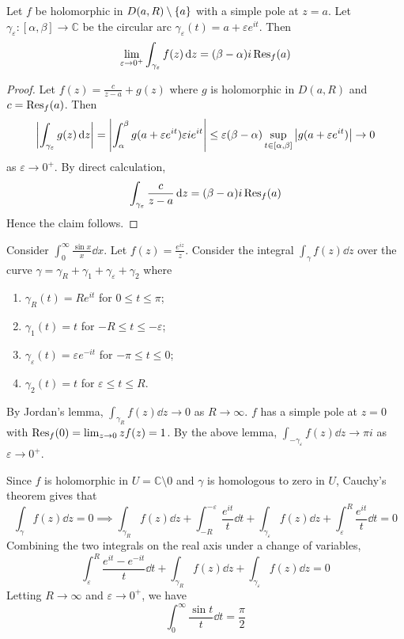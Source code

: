 \begin{lemma}
	Let \( f \) be holomorphic in \( D(a,R) \setminus \qty{a} \) with a simple pole at \( z = a \).
	Let \( \gamma_\varepsilon \colon [\alpha,\beta] \to \mathbb C \) be the circular arc \( \gamma_\varepsilon(t) = a + \varepsilon e^{it} \).
	Then
	\[
		\lim_{\varepsilon \to 0^+} \int_{\gamma_\varepsilon} f(z) \dd{z} = (\beta - \alpha) i \Res_f(a)
	\]
\end{lemma}
\begin{proof}
	Let \( f(z) = \frac{c}{z-a} + g(z) \) where \( g \) is holomorphic in \( D(a,R) \) and \( c = \Res_f(a) \).
	Then
	\[
		\abs{\int_{\gamma_\varepsilon} g(z) \dd{z}} = \abs{\int_\alpha^\beta g(a+\varepsilon e^{it}) \varepsilon i e^{it}} \leq \varepsilon (\beta - \alpha) \sup_{t \in [\alpha,\beta]} \abs{g(a+\varepsilon e^{it})} \to 0
	\]
	as \( \varepsilon \to 0^+ \).
	By direct calculation,
	\[
		\int_{\gamma_\varepsilon} \frac{c}{z-a} \dd{z} = (\beta-\alpha)i\Res_f(a)
	\]
	Hence the claim follows.
\end{proof}
\begin{example}
	Consider \( \int_0^\infty \frac{\sin x}{x} \dd{x} \).
	Let \( f(z) = \frac{e^{iz}}{z} \).
	Consider the integral \( \int_\gamma f(z) \dd{z} \) over the curve \( \gamma = \gamma_R + \gamma_1 + \gamma_\varepsilon + \gamma_2 \) where
	\begin{enumerate}
		\item \( \gamma_R(t) = Re^{it} \) for \( 0 \leq t \leq \pi \);
		\item \( \gamma_1(t) = t \) for \( -R \leq t \leq -\varepsilon \);
		\item \( \gamma_\varepsilon(t) = \varepsilon e^{-it} \) for \( -\pi \leq t \leq 0 \);
		\item \( \gamma_2(t) = t \) for \( \varepsilon \leq t \leq R \).
	\end{enumerate}
	By Jordan's lemma, \( \int_{\gamma_R} f(z) \dd{z} \to 0 \) as \( R \to \infty \).
	\( f \) has a simple pole at \( z = 0 \) with \( \Res_f(0) = \lim_{z \to 0} z f(z) = 1 \).
	By the above lemma, \( \int_{-\gamma_\varepsilon} f(z) \dd{z} \to \pi i \) as \( \varepsilon \to 0^+ \).

	Since \( f \) is holomorphic in \( U = \mathbb C \setminus \qty{0} \) and \( \gamma \) is homologous to zero in \( U \), Cauchy's theorem gives that
	\[
		\int_\gamma f(z) \dd{z} = 0 \implies \int_{\gamma_R} f(z) \dd{z} + \int_{-R}^{-\varepsilon} \frac{e^{it}}{t} \dd{t} + \int_{\gamma_\varepsilon} f(z) \dd{z} + \int_{\varepsilon}^R \frac{e^{it}}{t} \dd{t} = 0
	\]
	Combining the two integrals on the real axis under a change of variables,
	\[
		\int_{\varepsilon}^R \frac{e^{it} - e^{-it}}{t} \dd{t} + \int_{\gamma_R} f(z) \dd{z} + \int_{\gamma_{\varepsilon}} f(z) \dd{z} = 0
	\]
	Letting \( R \to \infty \) and \( \varepsilon \to 0^+ \), we have
	\[
		\int_0^\infty \frac{\sin t}{t} \dd{t} = \frac{\pi}{2}
	\]
\end{example}
